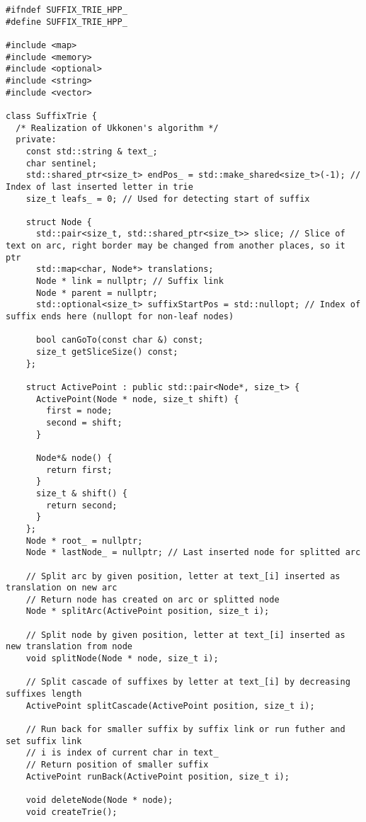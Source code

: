 \begin{verbatim}
#ifndef SUFFIX_TRIE_HPP_
#define SUFFIX_TRIE_HPP_

#include <map>
#include <memory>
#include <optional>
#include <string>
#include <vector>

class SuffixTrie {
  /* Realization of Ukkonen's algorithm */
  private:
    const std::string & text_;
    char sentinel;
    std::shared_ptr<size_t> endPos_ = std::make_shared<size_t>(-1); // Index of last inserted letter in trie
    size_t leafs_ = 0; // Used for detecting start of suffix
    
    struct Node {
      std::pair<size_t, std::shared_ptr<size_t>> slice; // Slice of text on arc, right border may be changed from another places, so it ptr
      std::map<char, Node*> translations;
      Node * link = nullptr; // Suffix link
      Node * parent = nullptr;
      std::optional<size_t> suffixStartPos = std::nullopt; // Index of suffix ends here (nullopt for non-leaf nodes)

      bool canGoTo(const char &) const;
      size_t getSliceSize() const;
    };

    struct ActivePoint : public std::pair<Node*, size_t> {
      ActivePoint(Node * node, size_t shift) {
        first = node;
        second = shift;
      }

      Node*& node() {
        return first;
      }
      size_t & shift() {
        return second;
      }
    };
    Node * root_ = nullptr;
    Node * lastNode_ = nullptr; // Last inserted node for splitted arc
                                
    // Split arc by given position, letter at text_[i] inserted as translation on new arc 
    // Return node has created on arc or splitted node
    Node * splitArc(ActivePoint position, size_t i);

    // Split node by given position, letter at text_[i] inserted as new translation from node 
    void splitNode(Node * node, size_t i);

    // Split cascade of suffixes by letter at text_[i] by decreasing suffixes length
    ActivePoint splitCascade(ActivePoint position, size_t i);

    // Run back for smaller suffix by suffix link or run futher and set suffix link
    // i is index of current char in text_
    // Return position of smaller suffix
    ActivePoint runBack(ActivePoint position, size_t i);

    void deleteNode(Node * node);
    void createTrie();


\end{verbatim}
